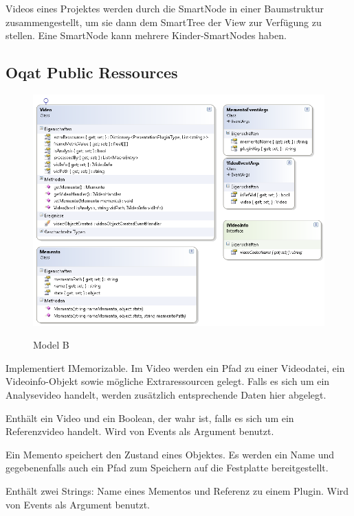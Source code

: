 Videos eines Projektes werden durch die SmartNode in einer Baumstruktur zusammengestellt, um sie dann dem SmartTree der View zur Verfügung zu stellen. Eine SmartNode kann mehrere Kinder-SmartNodes haben.

\pagebreak
\subsection{Oqat Public Ressources}
\begin{figure}[t]
\noindent\includegraphics[width=\linewidth]{bilder/Klassendiagramm/publicModel.png}
\label{Private Model B}
\caption{Model B}
\end{figure}

Implementiert IMemorizable. Im Video werden ein Pfad zu einer Videodatei, ein Videoinfo-Objekt sowie mögliche Extraressourcen gelegt. Falls es sich um ein Analysevideo handelt, werden zusätzlich entsprechende Daten hier abgelegt.


Enthält ein Video und ein Boolean, der wahr ist, falls es sich um ein Referenzvideo handelt. Wird von Events als Argument benutzt.


Ein Memento speichert den Zustand eines Objektes. Es werden ein Name und gegebenenfalls auch ein Pfad zum Speichern auf die Festplatte bereitgestellt.


Enthält zwei Strings: Name eines Mementos und Referenz zu einem Plugin. Wird von Events als Argument benutzt.


